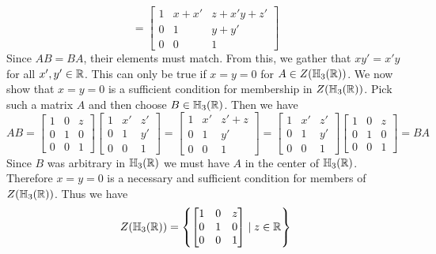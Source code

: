 \documentclass[11pt]{article}
\begin{document}
{$$        =
        \begin{bmatrix}
            1 & x+x' & z+x'y+z' \\
            0 & 1 & y+y' \\
            0 & 0 & 1
        \end{bmatrix}
        $$
        Since $AB = BA$, their elements must match.
        From this, we gather that $xy' = x'y$ for all $x', y' \in \mathbb{R}$.
        This can only be true if $x = y = 0$ for $A \in Z(\mathbb{H} _3(\mathbb{R}))$.
        We now show that $x = y = 0$ is a sufficient condition for membership in $Z ( \mathbb{H} _3 (\mathbb{R}))$.
        Pick such a matrix $A$ and then choose $B \in \mathbb{H} _3 (\mathbb{R})$.
        Then we have
        $$
        AB =
        \begin{bmatrix}
            1 & 0 & z \\
            0 & 1 & 0 \\
            0 & 0 & 1
        \end{bmatrix}
        \begin{bmatrix}
            1 & x' & z' \\
            0 & 1 & y' \\
            0 & 0 & 1
        \end{bmatrix}
        =
        \begin{bmatrix}
            1 & x' & z'+z \\
            0 & 1 & y' \\
            0 & 0 & 1
        \end{bmatrix}
        =
        \begin{bmatrix}
            1 & x' & z' \\
            0 & 1 & y' \\
            0 & 0 & 1
        \end{bmatrix}
        \begin{bmatrix}
            1 & 0 & z \\
            0 & 1 & 0 \\
            0 & 0 & 1
        \end{bmatrix}
        = BA
        $$
        Since $B$ was arbitrary in $\mathbb{H} _3 (\mathbb{R})$ we must have $A$ in the center of $\mathbb{H} _3 (\mathbb{R})$.
        Therefore $x = y = 0$ is a necessary and sufficient condition for members of $Z(\mathbb{H} _3 (\mathbb{R}))$.
        Thus we have
        $$
        Z( \mathbb{H} _3 (\mathbb{R})) = \left\{
        \begin{bmatrix}
            1 & 0 & z \\
            0 & 1 & 0 \\
            0 & 0 & 1
        \end{bmatrix}
        \mid z \in \mathbb{R} \right\}
        $$
    }
\end{document}
